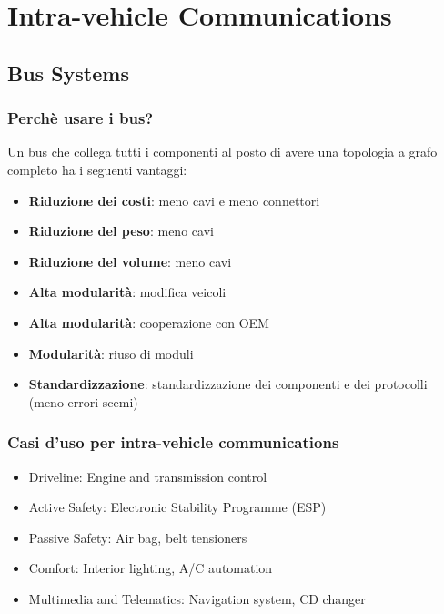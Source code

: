 


\chapter{Intra-vehicle Communications}

\section{Bus Systems}

\subsection{Perchè usare i bus?}
Un bus che collega tutti i componenti al posto di avere una topologia a grafo completo ha i seguenti vantaggi:
\begin{itemize}
	\item \textbf{Riduzione dei costi}: meno cavi e meno connettori
	\item \textbf{Riduzione del peso}: meno cavi
	\item \textbf{Riduzione del volume}: meno cavi
	\item \textbf{Alta modularità}: modifica veicoli
	\item \textbf{Alta modularità}: cooperazione con OEM
	\item \textbf{Modularità}: riuso di moduli
	\item \textbf{Standardizzazione}: standardizzazione dei componenti e dei protocolli (meno errori scemi)
\end{itemize}




\subsection{Casi d'uso per intra-vehicle communications}

\begin{itemize}
	\item Driveline: Engine and transmission control
	\item Active Safety: Electronic Stability Programme (ESP)
	\item Passive Safety: Air bag, belt tensioners
	\item Comfort: Interior lighting, A/C automation
	\item Multimedia and Telematics: Navigation system, CD changer
\end{itemize}

